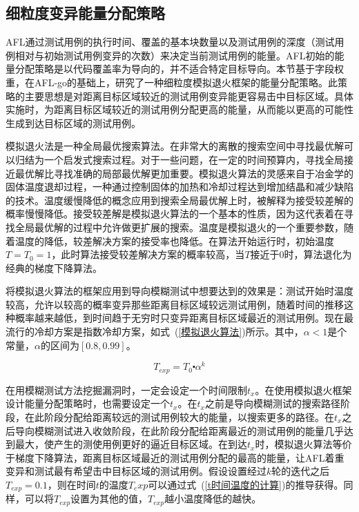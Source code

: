 \subsection{细粒度变异能量分配策略}

AFL通过测试用例的执行时间、覆盖的基本块数量以及测试用例的深度（测试用例相对与初始测试用例变异的次数）来决定当前测试用例的能量。AFL初始的能量分配策略是以代码覆盖率为导向的，并不适合特定目标导向。本节基于字段权重，在AFL-go的基础上，研究了一种细粒度模拟退火框架的能量分配策略。此策略的主要思想是对距离目标区域较近的测试用例变异能更容易击中目标区域。具体实施时，为距离目标区域较近的测试用例分配更高的能量，从而能以更高的可能性生成到达目标区域的测试用例。

模拟退火法是一种全局最优搜索算法。在非常大的离散的搜索空间中寻找最优解可以归结为一个启发式搜索过程。对于一些问题，在一定的时间预算内，寻找全局接近最优解比寻找准确的局部最优解更加重要。模拟退火算法的灵感来自于冶金学的固体温度退却过程，一种通过控制固体的加热和冷却过程达到增加结晶和减少缺陷的技术。温度缓慢降低的概念应用到搜索全局最优解上时，被解释为接受较差解的概率慢慢降低。接受较差解是模拟退火算法的一个基本的性质，因为这代表着在寻找全局最优解的过程中允许做更扩展的搜索。温度是模拟退火的一个重要参数，随着温度的降低，较差解决方案的接受率也降低。在算法开始运行时，初始温度$T=T_0=1$，此时算法接受较差解决方案的概率较高，当$T$接近于0时，算法退化为经典的梯度下降算法。

将模拟退火算法的框架应用到导向模糊测试中想要达到的效果是：测试开始时温度较高，允许以较高的概率变异那些距离目标区域较远测试用例，随着时间的推移这种概率越来越低，到时间趋于无穷时只变异距离目标区域最近的测试用例。现在最流行的冷却方案是指数冷却方案，如式~(\ref{模拟退火算法})所示。其中，$\alpha<1$是个常量，$\alpha$的区间为$[0.8,0.99]$。

\begin{equation}\label{模拟退火算法}
T_{exp} = T_0 \centerdot \alpha^{k}
\end{equation}

在用模糊测试方法挖掘漏洞时，一定会设定一个时间限制$t_x$。在使用模拟退火框架设计能量分配策略时，也需要设定一个$t_x$。在$t_x$之前是导向模糊测试的搜索路径阶段，在此阶段分配给距离较远的测试用例较大的能量，以搜索更多的路径。在$t_x$之后导向模糊测试进入收敛阶段，在此阶段分配给距离最近的测试用例的能量几乎达到最大，使产生的测使用例更好的逼近目标区域。在到达$t_x$时，模拟退火算法等价于梯度下降算法，距离目标区域最近的测试用例分配的最高的能量，让AFL着重变异和测试最有希望击中目标区域的测试用例。假设设置经过$k$轮的迭代之后$T_{exp}=0.1$，则在时间$t$的温度$T_exp$可以通过式~(\ref{t时间温度的计算})的推导获得。同样，可以将$T_{exp}$设置为其他的值，$T_{exp}$越小温度降低的越快。

